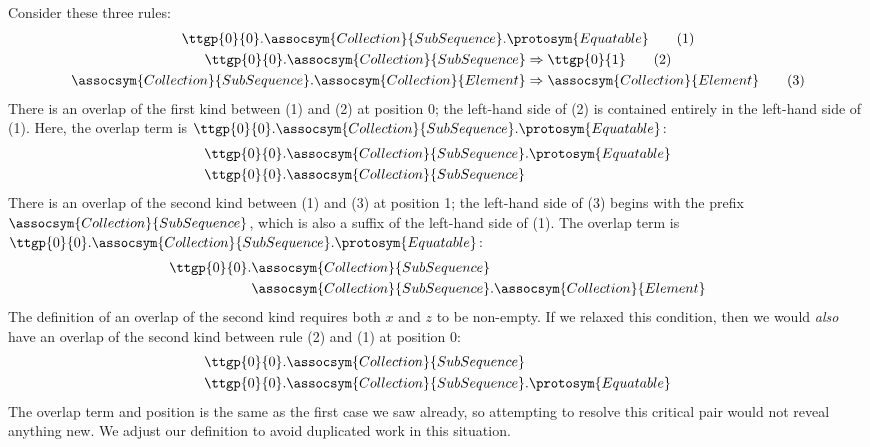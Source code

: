 \documentclass[../generics]{subfiles}
\begin{document}
\begin{example}
Consider these three rules:
\begin{gather*}
\ttgp{0}{0}.\assocsym{Collection}{SubSequence}.\protosym{Equatable}\tag{1}\\
\ttgp{0}{0}.\assocsym{Collection}{SubSequence}\Rightarrow\ttgp{0}{1}\tag{2}\\
\assocsym{Collection}{SubSequence}.\assocsym{Collection}{Element}\Rightarrow\assocsym{Collection}{Element}\tag{3}
\end{gather*}
There is an overlap of the first kind between (1) and (2) at position 0; the left-hand side of (2) is contained entirely in the left-hand side of (1). Here, the overlap term is $\ttgp{0}{0}.\assocsym{Collection}{SubSequence}.\protosym{Equatable}$:
\begin{align*}
&\ttgp{0}{0}.\assocsym{Collection}{SubSequence}.\protosym{Equatable}\\
&\ttgp{0}{0}.\assocsym{Collection}{SubSequence}
\end{align*}
There is an overlap of the second kind between (1) and (3) at position 1; the left-hand side of (3) begins with the prefix $\assocsym{Collection}{SubSequence}$, which is also a suffix of the left-hand side of (1). The overlap term is $\ttgp{0}{0}.\assocsym{Collection}{SubSequence}.\protosym{Equatable}$:
\begin{align*}
\ttgp{0}{0}.&\assocsym{Collection}{SubSequence}\\
&\assocsym{Collection}{SubSequence}.\assocsym{Collection}{Element}
\end{align*}
The definition of an overlap of the second kind requires both $x$ and $z$ to be non-empty. If we relaxed this condition, then we would \emph{also} have an overlap of the second kind between rule (2) and (1) at position 0:
\begin{align*}
&\ttgp{0}{0}.\assocsym{Collection}{SubSequence}\\
&\ttgp{0}{0}.\assocsym{Collection}{SubSequence}.\protosym{Equatable}
\end{align*}
The overlap term and position is the same as the first case we saw already, so attempting to resolve this critical pair would not reveal anything new. We adjust our definition to avoid duplicated work in this situation.


\end{example}
\end{document}
